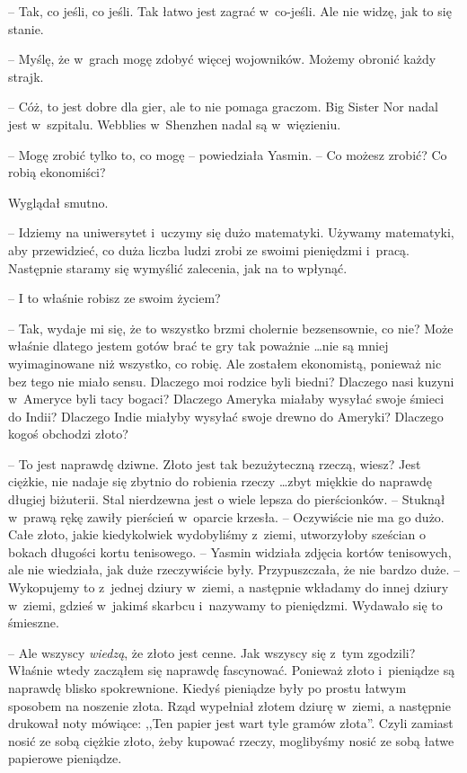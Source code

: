 \documentclass[oneside,polish,11pt,rmheadings]{mwbk}
\begin{document}
-- Tak, co jeśli, co jeśli. Tak łatwo jest zagrać w~co-jeśli. Ale nie widzę, jak to się stanie.

-- Myślę, że w~grach mogę zdobyć więcej wojowników. Możemy obronić każdy strajk.

-- Cóż, to jest dobre dla gier, ale to nie pomaga graczom. Big Sister Nor nadal jest w~szpitalu. Webblies w~Shenzhen nadal są w~więzieniu.

-- Mogę zrobić tylko to, co mogę -- powiedziała Yasmin. -- Co możesz zrobić? Co robią ekonomiści?

Wyglądał smutno. 

-- Idziemy na uniwersytet i~uczymy się dużo matematyki. Używamy matematyki, aby przewidzieć, co duża liczba ludzi zrobi ze swoimi pieniędzmi i~pracą. Następnie staramy się wymyślić zalecenia, jak na to wpłynąć.

-- I to właśnie robisz ze swoim życiem?

-- Tak, wydaje mi się, że to wszystko brzmi cholernie bezsensownie, co nie? Może właśnie dlatego jestem gotów brać te gry tak poważnie  \ldots  nie są mniej wyimaginowane niż wszystko, co robię. Ale zostałem ekonomistą, ponieważ nic bez tego nie miało sensu. Dlaczego moi rodzice byli biedni? Dlaczego nasi kuzyni w~Ameryce byli tacy bogaci? Dlaczego Ameryka miałaby wysyłać swoje śmieci do Indii? Dlaczego Indie miałyby wysyłać swoje drewno do Ameryki? Dlaczego kogoś obchodzi złoto?

-- To jest naprawdę dziwne. Złoto jest tak bezużyteczną rzeczą, wiesz? Jest ciężkie, nie nadaje się zbytnio do robienia rzeczy  \ldots  zbyt miękkie do naprawdę długiej biżuterii. Stal nierdzewna jest o wiele lepsza do pierścionków. -- Stuknął w~prawą rękę zawiły pierścień w~oparcie krzesła. -- Oczywiście nie ma go dużo. Całe złoto, jakie kiedykolwiek wydobyliśmy z~ziemi, utworzyłoby sześcian o bokach długości kortu tenisowego. -- Yasmin widziała zdjęcia kortów tenisowych, ale nie wiedziała, jak duże rzeczywiście były. Przypuszczała, że nie bardzo duże. -- Wykopujemy to z~jednej dziury w~ziemi, a następnie wkładamy do innej dziury w~ziemi, gdzieś w~jakimś skarbcu i~nazywamy to pieniędzmi. Wydawało się to śmieszne.

-- Ale wszyscy \textit{wiedzą}, że złoto jest cenne. Jak wszyscy się z~tym zgodzili? Właśnie wtedy zacząłem się naprawdę fascynować. Ponieważ złoto i~pieniądze są naprawdę blisko spokrewnione. Kiedyś pieniądze były po prostu łatwym sposobem na noszenie złota. Rząd wypełniał złotem dziurę w~ziemi, a następnie drukował noty mówiące: ,,Ten papier jest wart tyle gramów złota''. Czyli zamiast nosić ze sobą ciężkie złoto, żeby kupować rzeczy, moglibyśmy nosić ze sobą łatwe papierowe pieniądze.
\end{document}
